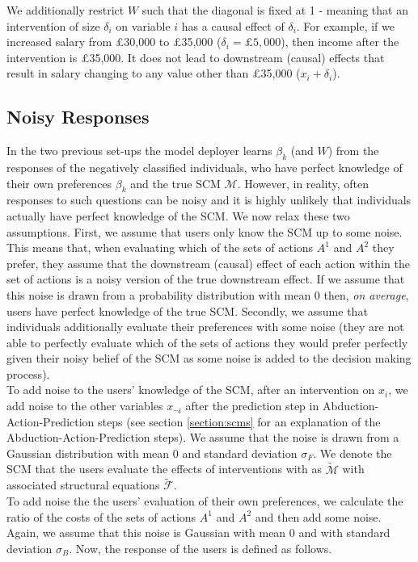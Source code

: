 We additionally restrict $W$ such that the diagonal is fixed at 1 - meaning that an intervention of size $\delta_i$ on variable $i$ has a causal effect of $\delta_i$. For example, if we increased salary from £30,000 to £35,000 ($\delta_i=£5,000$), then income after the intervention is £35,000. It does not lead to downstream (causal) effects that result in salary changing to any value other than £35,000 ($x_i + \delta_i$).

\subsection{Noisy Responses}

In the two previous set-ups the model deployer learns $\beta_k$ (and $W$) from the responses of the negatively classified individuals, who have perfect knowledge of their own preferences $\beta_k$ and the true SCM $\mathcal{M}$. However, in reality, often responses to such questions can be noisy and it is highly unlikely that individuals actually have perfect knowledge of the SCM. We now relax these two assumptions. First, we assume that users only know the SCM up to some noise. This means that, when evaluating which of the sets of actions $A^1$ and $A^2$ they prefer, they assume that the downstream (causal) effect of each action within the set of actions is a noisy version of the true downstream effect. If we assume that this noise is drawn from a probability distribution with mean 0 then, \textit{on average}, users have perfect knowledge of the true SCM. Secondly, we assume that individuals additionally evaluate their preferences with some noise (they are not able to perfectly evaluate which of the sets of actions they would prefer perfectly given their noisy belief of the SCM as some noise is added to the decision making process).\\

To add noise to the users' knowledge of the SCM, after an intervention on $x_i$, we add noise to the other variables $x_{\neg i}$ after the prediction step in Abduction-Action-Prediction steps \citep{pearl2016causal} (see section \ref{section:scms} for an explanation of the Abduction-Action-Prediction steps). We assume that the noise is drawn from a Gaussian distribution with mean 0 and standard deviation $\sigma_F$. We denote the SCM that the users evaluate the effects of interventions with as $\tilde{\mathcal{M}}$ with associated structural equations $\tilde{\mathcal{F}}$.\\

To add noise the the users' evaluation of their own preferences, we calculate the ratio of the costs of the sets of actions $A^1$ and $A^2$ and then add some noise. Again, we assume that this noise is Gaussian with mean 0 and with standard deviation $\sigma_B$. Now, the response of the users is defined as follows.

